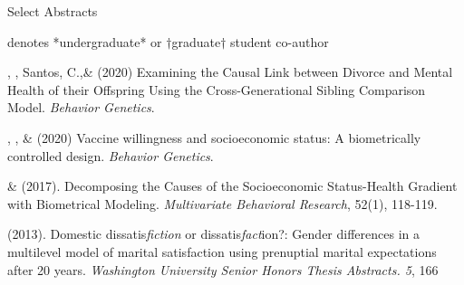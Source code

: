 \begin{rSection}{\textrm{Select Abstracts}}%
\vspace{-1mm}\begin{center}\footnotesize{denotes *undergraduate* or $\dagger$graduate$\dagger$ student co-author}\end{center}\vspace{-1mm}
%
\begin{etaremune}

\item \kl, \jt, Santos, C.,\noteBns \& \meb (2020) Examining the Causal Link between Divorce and Mental Health of their Offspring Using the Cross-Generational Sibling Comparison Model. \textit{Behavior Genetics}. 

\item \jt, \kl, \& \meb (2020) Vaccine willingness and socioeconomic status: A biometrically controlled design. \textit{Behavior Genetics}. 

\item\meb \& \joe (2017). Decomposing the Causes of the Socioeconomic Status-Health Gradient with Biometrical Modeling. \textit{Multivariate Behavioral Research}, 52(1), 118-119. 

\item\meb (2013). Domestic dissatis{\em fiction} or dissatis{\em fact}ion?: Gender differences in a multilevel model of marital satisfaction using prenuptial marital expectations after 20 years. {\em Washington University Senior Honors Thesis Abstracts. 5}, 166

\end{etaremune}
\end{rSection}